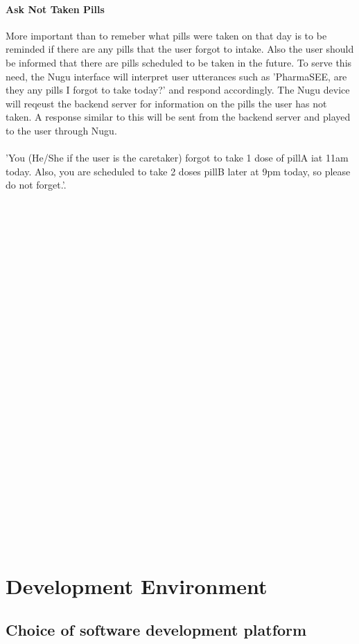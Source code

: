 \documentclass[conference]{IEEEtran}
\begin{document}
\paragraph{Ask Not Taken Pills}
More important than to remeber what pills were taken on that day is to be reminded if there are any pills that the user forgot to intake. Also the user should be informed that there are pills scheduled to be taken in the future. To serve this need, the Nugu interface will interpret user utterances such as 'PharmaSEE, are they any pills I forgot to take today?' and respond accordingly. The Nugu device will reqeust the backend server for information on the pills the user has not taken. A response similar to this will be sent from the backend server and played to the user through Nugu. \\ \\
'You (He/She if the user is the caretaker) forgot to take 1 dose of pillA iat 11am today. Also, you are scheduled to take 2 doses pillB later at 9pm today, so please do not forget.'.\\
\\
\\
\\
\\
\\
\\
\\
\\
\\
\\
\\
\\
\\
\\
\\
\\
\\
\\
\\
\\
\\
\\
\\
\\
\\
\\
\section{Development Environment}
\subsection{Choice of software development platform}\label{AA}
\end{document}
